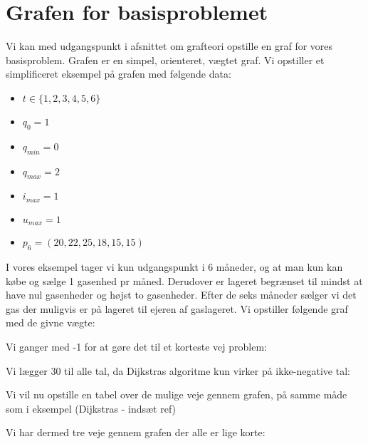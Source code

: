 \section{Grafen for basisproblemet}
Vi kan med udgangspunkt i afsnittet om grafteori opstille en graf for vores basisproblem. Grafen er en simpel, orienteret, vægtet graf. Vi opstiller et simplificeret eksempel på grafen med følgende data:
\begin{itemize}
  \item $t \in \{1,2,3,4,5,6\}$
  \item $q_{0}=1$
  \item $q_{min}=0$
  \item $q_{max}=2$
  \item $i_{max}=1$
  \item $u_{max}=1$
  \item $p_{6}=(20,22,25,18,15,15)$
\end{itemize}

I vores eksempel tager vi kun udgangspunkt i 6 måneder, og at man kun kan købe og sælge 1 gasenhed pr måned. Derudover er lageret begrænset til mindst at have nul gasenheder og højst to gasenheder. Efter de seks måneder sælger vi det gas der muligvis er på lageret til ejeren af gaslageret. Vi opstiller følgende graf med de givne vægte:



Vi ganger med -1 for at gøre det til et korteste vej problem:



Vi lægger 30 til alle tal, da Dijkstras algoritme kun virker på ikke-negative tal:




Vi vil nu opstille en tabel over de mulige veje gennem grafen, på samme måde som i eksempel (Dijkstras - indsæt ref)



Vi har dermed tre veje gennem grafen der alle er lige korte:

